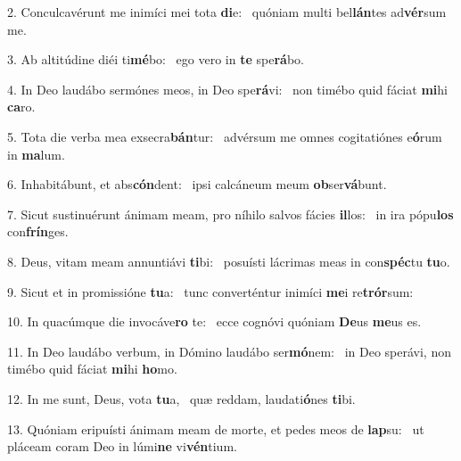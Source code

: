 2. Conculcavérunt me inimíci mei tota \textbf{di}e: \ast\  quóniam multi bel\textbf{lán}tes ad\textbf{vér}sum me.\

3. Ab altitúdine diéi ti\textbf{mé}bo: \ast\  ego vero in \textbf{te} spe\textbf{rá}bo.\

4. In Deo laudábo sermónes meos, in Deo spe\textbf{rá}vi: \ast\  non timébo quid fáciat \textbf{mi}hi \textbf{ca}ro.\

5. Tota die verba mea exsecra\textbf{bán}tur: \ast\  advérsum me omnes cogitatiónes e\textbf{ó}rum in \textbf{ma}lum.\

6. Inhabitábunt, et abs\textbf{cón}dent: \ast\  ipsi calcáneum meum \textbf{ob}ser\textbf{vá}bunt.\

7. Sicut sustinuérunt ánimam meam, pro níhilo salvos fácies \textbf{il}los: \ast\  in ira pópu\textbf{los} con\textbf{frín}ges.\

8. Deus, vitam meam annuntiávi \textbf{ti}bi: \ast\  posuísti lácrimas meas in con\textbf{spéc}tu \textbf{tu}o.\

9. Sicut et in promissióne \textbf{tu}a: \ast\  tunc converténtur inimíci \textbf{me}i re\textbf{trór}sum:\

10. In quacúmque die invocáve\textbf{ro} te: \ast\  ecce cognóvi quóniam \textbf{De}us \textbf{me}us es.\

11. In Deo laudábo verbum, in Dómino laudábo ser\textbf{mó}nem: \ast\  in Deo sperávi, non timébo quid fáciat \textbf{mi}hi \textbf{ho}mo.\

12. In me sunt, Deus, vota \textbf{tu}a, \ast\  quæ reddam, laudati\textbf{ó}nes \textbf{ti}bi.\

13. Quóniam eripuísti ánimam meam de morte, et pedes meos de \textbf{lap}su: \ast\  ut pláceam coram Deo in lúmi\textbf{ne} vi\textbf{vén}tium.\

